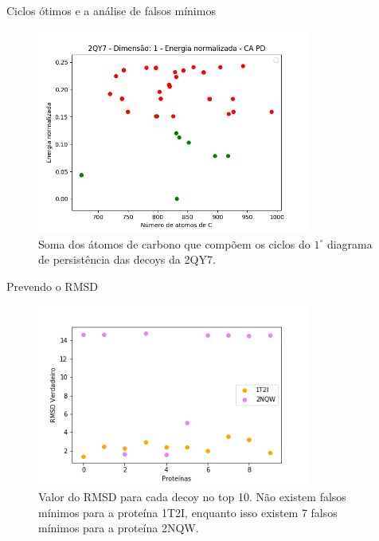\documentclass[10pt]{beamer}
\begin{document}
\begin{frame}{Ciclos ótimos e a análise de falsos mínimos}
    \begin{figure}
    \centering
    \includegraphics[width=0.8\textwidth]{images/cyc2qy7.png}
    \caption{Soma dos átomos de carbono que compõem os ciclos do
            $1^\circ$ diagrama de persistência das decoys da 2QY7.}
    \end{figure}
\end{frame}

\begin{frame}{Prevendo o RMSD}
    \begin{figure}
    \centering
    \includegraphics[width=0.8\textwidth]{images/true_rmsd.png}
    \caption{Valor do RMSD para cada decoy no top 10. Não existem falsos mínimos para a proteína 1T2I, enquanto
    isso existem 7 falsos mínimos para a proteína 2NQW.}
    \label{fig:truermsd}
\end{figure}
\end{frame}
\end{document}
